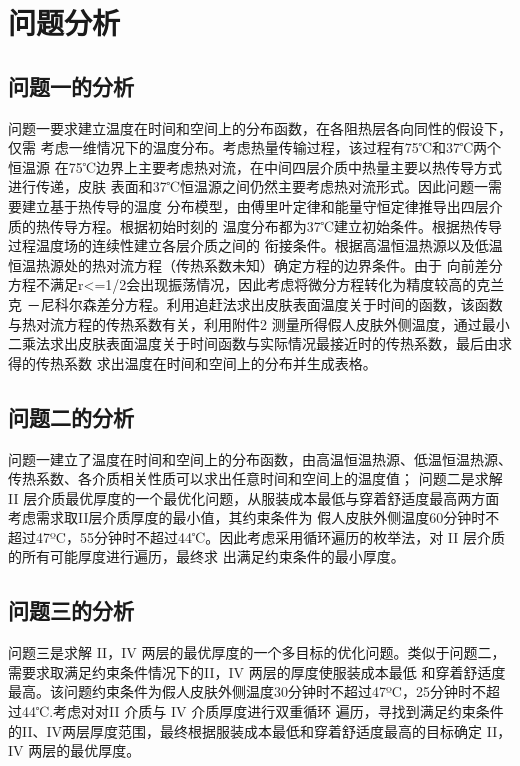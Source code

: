 \documentclass{cumcmthesis}
\begin{document}
\section{问题分析}
    
    \subsection{问题一的分析}
    问题一要求建立温度在时间和空间上的分布函数，在各阻热层各向同性的假设下，仅需
    考虑一维情况下的温度分布。考虑热量传输过程，该过程有75℃和37℃两个恒温源
    在75℃边界上主要考虑热对流，在中间四层介质中热量主要以热传导方式进行传递，皮肤
    表面和37℃恒温源之间仍然主要考虑热对流形式。因此问题一需要建立基于热传导的温度
    分布模型，由傅里叶定律和能量守恒定律推导出四层介质的热传导方程。根据初始时刻的
    温度分布都为37℃建立初始条件。根据热传导过程温度场的连续性建立各层介质之间的
    衔接条件。根据高温恒温热源以及低温恒温热源处的热对流方程（传热系数未知）确定方程的边界条件。由于
    向前差分方程不满足r<=1/2会出现振荡情况，因此考虑将微分方程转化为精度较高的克兰克
    －尼科尔森差分方程。利用追赶法求出皮肤表面温度关于时间的函数，该函数与热对流方程的传热系数有关，利用附件2
    测量所得假人皮肤外侧温度，通过最小二乘法求出皮肤表面温度关于时间函数与实际情况最接近时的传热系数，最后由求得的传热系数
    求出温度在时间和空间上的分布并生成表格。

    \subsection{问题二的分析}
    问题一建立了温度在时间和空间上的分布函数，由高温恒温热源、低温恒温热源、传热系数、各介质相关性质可以求出任意时间和空间上的温度值；
    问题二是求解 II 层介质最优厚度的一个最优化问题，从服装成本最低与穿着舒适度最高两方面考虑需求取II层介质厚度的最小值，其约束条件为
    假人皮肤外侧温度60分钟时不超过47ºC，55分钟时不超过44℃。因此考虑采用循环遍历的枚举法，对 II 层介质的所有可能厚度进行遍历，最终求
    出满足约束条件的最小厚度。 

    \subsection{问题三的分析}
    问题三是求解 II，IV 两层的最优厚度的一个多目标的优化问题。类似于问题二，需要求取满足约束条件情况下的II，IV 两层的厚度使服装成本最低
    和穿着舒适度最高。该问题约束条件为假人皮肤外侧温度30分钟时不超过47ºC，25分钟时不超过44℃.考虑对对II 介质与 IV 介质厚度进行双重循环
    遍历，寻找到满足约束条件的II、IV两层厚度范围，最终根据服装成本最低和穿着舒适度最高的目标确定 II，IV 两层的最优厚度。
\end{document}

